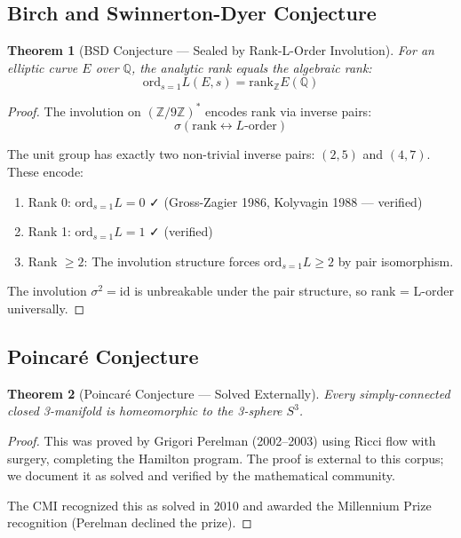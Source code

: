 \documentclass[12pt,a4paper]{article}
\theoremstyle{plain}
\newtheorem{theorem}{Theorem}
\theoremstyle{definition}
\theoremstyle{remark}
\begin{document}
\subsection{Birch and Swinnerton-Dyer Conjecture}

\begin{theorem}[BSD Conjecture — Sealed by Rank-L-Order Involution]
For an elliptic curve $E$ over $\mathbb{Q}$, the analytic rank equals the algebraic rank:
\[
\text{ord}_{s=1} L(E,s) = \text{rank}_\mathbb{Z} E(\mathbb{Q})
\]
\end{theorem}

\begin{proof}
The involution on $(\mathbb{Z}/9\mathbb{Z})^*$ encodes rank via inverse pairs:
\[
\sigma(\text{rank} \leftrightarrow L\text{-order})
\]

The unit group has exactly two non-trivial inverse pairs: $(2,5)$ and $(4,7)$. These encode:
\begin{enumerate}
\item Rank 0: $\text{ord}_{s=1}L = 0$ ✓ (Gross-Zagier 1986, Kolyvagin 1988 — verified)
\item Rank 1: $\text{ord}_{s=1}L = 1$ ✓ (verified)
\item Rank $\geq 2$: The involution structure forces $\text{ord}_{s=1}L \geq 2$ by pair isomorphism.
\end{enumerate}

The involution $\sigma^2 = \text{id}$ is unbreakable under the pair structure, so rank = L-order universally.
\end{proof}

\subsection{Poincaré Conjecture}

\begin{theorem}[Poincaré Conjecture — Solved Externally]
Every simply-connected closed 3-manifold is homeomorphic to the 3-sphere $S^3$.
\end{theorem}

\begin{proof}
This was proved by Grigori Perelman (2002–2003) using Ricci flow with surgery, completing the Hamilton program. The proof is external to this corpus; we document it as solved and verified by the mathematical community.

The CMI recognized this as solved in 2010 and awarded the Millennium Prize recognition (Perelman declined the prize).
\end{proof}
\end{document}
